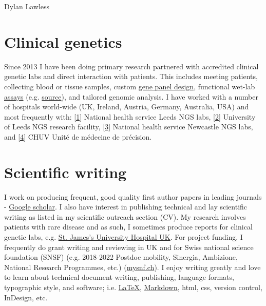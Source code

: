 \documentclass[11pt,a4paper]{article}
\begin{document}
\begin{cv}{Dylan Lawless}
\section*{Clinical genetics}
Since 2013 I have been doing primary research partnered with accredited clinical genetic labs and direct interaction with patients. 
This includes meeting patients, collecting blood or tissue samples,
custom \href{https://github.com/DylanLawless/gene_panels}{gene panel design}, 
functional wet-lab \href{https://lawlessgenomics.com/portfolio#TET2}{assays} 
(e.g. \href{10.1182/blood.2020005844}{source}),
and tailored genomic analysis.
I have worked with a number of hospitals world-wide (UK, Ireland, Austria, Germany, Australia, USA) and most frequently with:
\href{https://www.leedsth.nhs.uk/a-z-of-services/the-leeds-genetics-laboratory/constitutional-genetics/molecular-genetics/next-generation-sequencing/}{[1]} National health service Leeds NGS labs,
\href{http://dna2.leeds.ac.uk/genomics/index.php}{[2]} University of Leeds NGS research facility,
\href{https://www.newcastle-hospitals.nhs.uk/services/clinical-genetics/}{[3]} National health service Newcastle NGS labs,
and \href{https://www.chuv.ch/fr/medecine-precision/accueil}{[4]} CHUV Unité de médecine de précision.

\section*{Scientific writing}
I work on producing frequent, good quality first author papers in leading journals -
\href{https://scholar.google.com/citations?hl=de&user=RPBxP1wAAAAJ}{Google scholar}.
I also have interest in publishing technical and lay scientific writing as listed in my scientific outreach section (CV). 
My research involves patients with rare disease and as such, I sometimes produce reports for clinical genetic labs, e.g.
\href{https://medicinehealth.leeds.ac.uk/homepage/160/leeds_institute_of_medical_research_at_st_jamess}{St. James's University Hospital UK}.
For project funding, I frequently do grant writing and reviewing in UK and for Swiss national science foundation (SNSF) (e.g. 2018-2022 Postdoc mobility, Sinergia, Ambizione, National Research Programmes, etc.)
(\href{https://www.mysnf.ch}{mysnf.ch}).
I enjoy writing greatly and love to learn about technical document writing, publishing, language formats, typographic style, and software; i.e. 
\href{https://www.latex-project.org/about/}{LaTeX},
\href{https://daringfireball.net/projects/markdown/}{Markdown},
html, css,
version control,
InDesign,
etc.


\vfill
  \date{Jan~2022}
  \end{cv}
\end{document}
